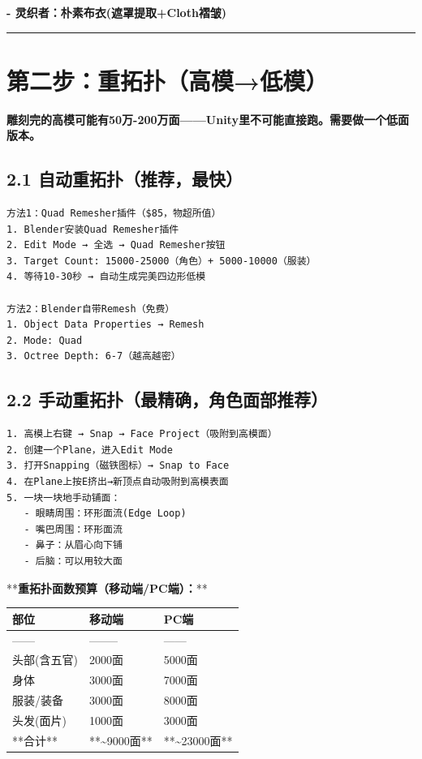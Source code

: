 \documentclass[12pt,a4paper,openany]{ctexbook}
\begin{document}
\textbf{- 灵织者：朴素布衣(遮罩提取+Cloth褶皱)}


\bigskip\hrule\bigskip


\section*{第二步：重拓扑（高模→低模）}


\textbf{雕刻完的高模可能有50万-200万面——Unity里不可能直接跑。需要做一个低面版本。}


\subsection*{2.1 自动重拓扑（推荐，最快）}


\begin{verbatim}
方法1：Quad Remesher插件（$85，物超所值）
1. Blender安装Quad Remesher插件
2. Edit Mode → 全选 → Quad Remesher按钮
3. Target Count: 15000-25000（角色）+ 5000-10000（服装）
4. 等待10-30秒 → 自动生成完美四边形低模

方法2：Blender自带Remesh（免费）
1. Object Data Properties → Remesh
2. Mode: Quad
3. Octree Depth: 6-7（越高越密）
\end{verbatim}


\subsection*{2.2 手动重拓扑（最精确，角色面部推荐）}


\begin{verbatim}
1. 高模上右键 → Snap → Face Project（吸附到高模面）
2. 创建一个Plane，进入Edit Mode
3. 打开Snapping（磁铁图标）→ Snap to Face
4. 在Plane上按E挤出→新顶点自动吸附到高模表面
5. 一块一块地手动铺面：
   - 眼睛周围：环形面流(Edge Loop)
   - 嘴巴周围：环形面流
   - 鼻子：从眉心向下铺
   - 后脑：可以用较大面
\end{verbatim}


**\textbf{重拓扑面数预算（移动端/PC端）：}**


\begin{tabular}{|l|l|l|}
\hline
部位 & 移动端 & PC端 \\
\hline
------ & -------- & ------ \\
头部(含五官) & 2000面 & 5000面 \\
身体 & 3000面 & 7000面 \\
服装/装备 & 3000面 & 8000面 \\
头发(面片) & 1000面 & 3000面 \\
**合计** & **\textasciitilde{}9000面** & **\textasciitilde{}23000面** \\
\hline
\end{tabular}
\end{document}
